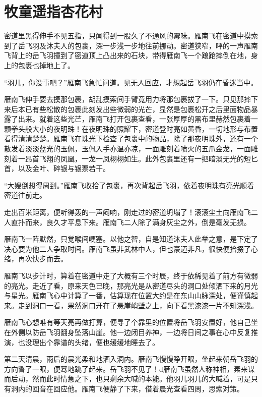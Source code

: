 
\chapter{牧童遥指杏花村}
\label{chap:mu-tong-yao-zhi-xing-hua-cun}

密道里黑得伸手不见五指，只闻得到一股久了不通风的霉味。雁南飞在密道中摸索到了岳飞羽及沐夫人的包裹，深一步浅一步地往前挪动。密道狭窄，呯的一声雁南飞背上的岳飞羽撞到了密道顶上凸出来的石块，带得雁南飞一个踉跄摔倒在地，身上的包裹也掉地上了。

“羽儿，你没事吧？”雁南飞急忙问道。见无人回应，才想起岳飞羽仍在昏迷当中。

雁南飞伸手要去摸那包裹，胡乱摸索间手臂竟用力将那包裹拔了一下。只见那摔下来后本已有些松散的包裹此刻发出些微弱的光芒，显然是包裹松开之后里面物品暴露了出来。就着这些光芒，雁南飞打开包裹查看，一张厚厚的黑布里赫然包裹着一颗拳头般大小的夜明珠！在夜明珠的照耀下，密道登时亮如黄昏，一切地形与布置看得清清楚楚。雁南飞在珠光下检查了包裹中的物品，除了那夜明珠外，还有一个散发着淡淡蓝光的玉佩，玉佩入手亦温亦凉，一面雕刻着喷火的五爪金龙，一面雕刻着一昂首飞翔的凤凰，一龙一凤栩栩如生。此外包裹里还有一把暗淡无光的短匕首，以及金叶、碎银与银票若干。

“大嫂倒想得周到。”雁南飞收拾了包裹，再次背起岳飞羽，依着夜明珠有亮光顺着密道往前走。

走出百米距离，便听得轰的一声闷响，刚走过的密道坍塌了！滚滚尘土向雁南飞二人直扑而来，良久才平息下来。雁南飞二人除了满身灰尘之外，倒是毫发无损。

雁南飞一阵默然，只觉喉间哽塞。以他之智，自是知道沐夫人此举之意，是下定了决心要为他二人争取时间。雁南飞虽非武林中人，但也豪迈非凡，很快便拾掇了心绪，再次快步而去。

雁南飞以步计时，算着在密道中走了大概有三个时辰，终于依稀见着了前方有微弱的亮光。走近了看，原来天色已晚，那亮光是从密道尽头的洞口处倾洒下来的月光与星光。雁南飞心中计算了一番，估算现在位置大约是在东山山脉深处，便谨慎起来。走到洞口一看，果然洞口开在了悬崖峭壁之上，向下看黑漆漆一片不知深浅。

雁南飞心想唯有等天亮再做打算，便寻了个靠里的位置将岳飞羽安置好，他自己坐在外侧以防岳飞羽翻身坠落山崖。他一边闭目养神，一边将日间之事在心中反复推演，也没理出个靠谱的头绪，便也缓缓地睡去了。

第二天清晨，雨后的晨光柔和地洒入洞内。雁南飞慢慢睁开眼，坐起来朝岳飞羽的方向瞥了一眼，便蓦地跳了起来。岳飞羽不见了！d雁南飞虽然人称神相，素来谋而后动，然而此时情急之下，也只剩余大喊的本能。他羽儿羽儿的大喊着，可是只有洞内的回音在回应他。雁南飞便静了下来，借着晨光查看四周，思索对策。

